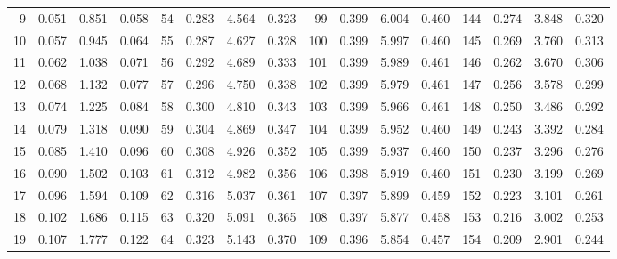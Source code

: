 \begin{table}[!h]
{\begin{tabular}{rrrr|rrrr|rrrr|rrrr}
  9 & \tiny{  0.051} &   0.851 & \tiny{  0.058} &  54 & \tiny{  0.283} &   4.564 & \tiny{  0.323} &  99 & \tiny{  0.399} &   6.004 & \tiny{  0.460} & 144 & \tiny{  0.274} &   3.848 & \tiny{  0.320}\\
 10 & \tiny{  0.057} &   0.945 & \tiny{  0.064} &  55 & \tiny{  0.287} &   4.627 & \tiny{  0.328} & 100 & \tiny{  0.399} &   5.997 & \tiny{  0.460} & 145 & \tiny{  0.269} &   3.760 & \tiny{  0.313}\\
 11 & \tiny{  0.062} &   1.038 & \tiny{  0.071} &  56 & \tiny{  0.292} &   4.689 & \tiny{  0.333} & 101 & \tiny{  0.399} &   5.989 & \tiny{  0.461} & 146 & \tiny{  0.262} &   3.670 & \tiny{  0.306}\\
 12 & \tiny{  0.068} &   1.132 & \tiny{  0.077} &  57 & \tiny{  0.296} &   4.750 & \tiny{  0.338} & 102 & \tiny{  0.399} &   5.979 & \tiny{  0.461} & 147 & \tiny{  0.256} &   3.578 & \tiny{  0.299}\\
 13 & \tiny{  0.074} &   1.225 & \tiny{  0.084} &  58 & \tiny{  0.300} &   4.810 & \tiny{  0.343} & 103 & \tiny{  0.399} &   5.966 & \tiny{  0.461} & 148 & \tiny{  0.250} &   3.486 & \tiny{  0.292}\\
 14 & \tiny{  0.079} &   1.318 & \tiny{  0.090} &  59 & \tiny{  0.304} &   4.869 & \tiny{  0.347} & 104 & \tiny{  0.399} &   5.952 & \tiny{  0.460} & 149 & \tiny{  0.243} &   3.392 & \tiny{  0.284}\\
 15 & \tiny{  0.085} &   1.410 & \tiny{  0.096} &  60 & \tiny{  0.308} &   4.926 & \tiny{  0.352} & 105 & \tiny{  0.399} &   5.937 & \tiny{  0.460} & 150 & \tiny{  0.237} &   3.296 & \tiny{  0.276}\\
 16 & \tiny{  0.090} &   1.502 & \tiny{  0.103} &  61 & \tiny{  0.312} &   4.982 & \tiny{  0.356} & 106 & \tiny{  0.398} &   5.919 & \tiny{  0.460} & 151 & \tiny{  0.230} &   3.199 & \tiny{  0.269}\\
 17 & \tiny{  0.096} &   1.594 & \tiny{  0.109} &  62 & \tiny{  0.316} &   5.037 & \tiny{  0.361} & 107 & \tiny{  0.397} &   5.899 & \tiny{  0.459} & 152 & \tiny{  0.223} &   3.101 & \tiny{  0.261}\\
 18 & \tiny{  0.102} &   1.686 & \tiny{  0.115} &  63 & \tiny{  0.320} &   5.091 & \tiny{  0.365} & 108 & \tiny{  0.397} &   5.877 & \tiny{  0.458} & 153 & \tiny{  0.216} &   3.002 & \tiny{  0.253}\\
 19 & \tiny{  0.107} &   1.777 & \tiny{  0.122} &  64 & \tiny{  0.323} &   5.143 & \tiny{  0.370} & 109 & \tiny{  0.396} &   5.854 & \tiny{  0.457} & 154 & \tiny{  0.209} &   2.901 & \tiny{  0.244}\\

\end{tabular}}
\end{table}
